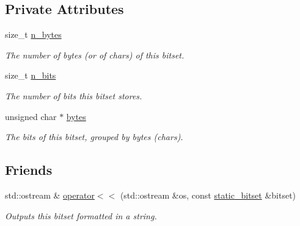 \subsection*{Private Attributes}
\begin{DoxyCompactItemize}
\item 
\mbox{\label{classlgraph_1_1utils_1_1static__bitset_aa3f7a6d10e41df757ca86e3636cb85d4}} 
size\+\_\+t \hyperlink{classlgraph_1_1utils_1_1static__bitset_aa3f7a6d10e41df757ca86e3636cb85d4}{n\+\_\+bytes}
\begin{DoxyCompactList}\small\item\em The number of bytes (or of chars) of this bitset. \end{DoxyCompactList}\item 
\mbox{\label{classlgraph_1_1utils_1_1static__bitset_aebc02986838d70f13d3c10f390d11211}} 
size\+\_\+t \hyperlink{classlgraph_1_1utils_1_1static__bitset_aebc02986838d70f13d3c10f390d11211}{n\+\_\+bits}
\begin{DoxyCompactList}\small\item\em The number of bits this bitset stores. \end{DoxyCompactList}\item 
\mbox{\label{classlgraph_1_1utils_1_1static__bitset_a56d277fc22bbf71a27fca530a133c9bd}} 
unsigned char $\ast$ \hyperlink{classlgraph_1_1utils_1_1static__bitset_a56d277fc22bbf71a27fca530a133c9bd}{bytes}
\begin{DoxyCompactList}\small\item\em The bits of this bitset, grouped by bytes (chars). \end{DoxyCompactList}\end{DoxyCompactItemize}
\subsection*{Friends}
\begin{DoxyCompactItemize}
\item 
\mbox{\label{classlgraph_1_1utils_1_1static__bitset_a8861fbd2d9aa094fd65123105fe90d0b}} 
std\+::ostream \& \hyperlink{classlgraph_1_1utils_1_1static__bitset_a8861fbd2d9aa094fd65123105fe90d0b}{operator$<$$<$} (std\+::ostream \&os, const \hyperlink{classlgraph_1_1utils_1_1static__bitset}{static\+\_\+bitset} \&bitset)
\begin{DoxyCompactList}\small\item\em Outputs this bitset formatted in a string. \end{DoxyCompactList}\end{DoxyCompactItemize}


